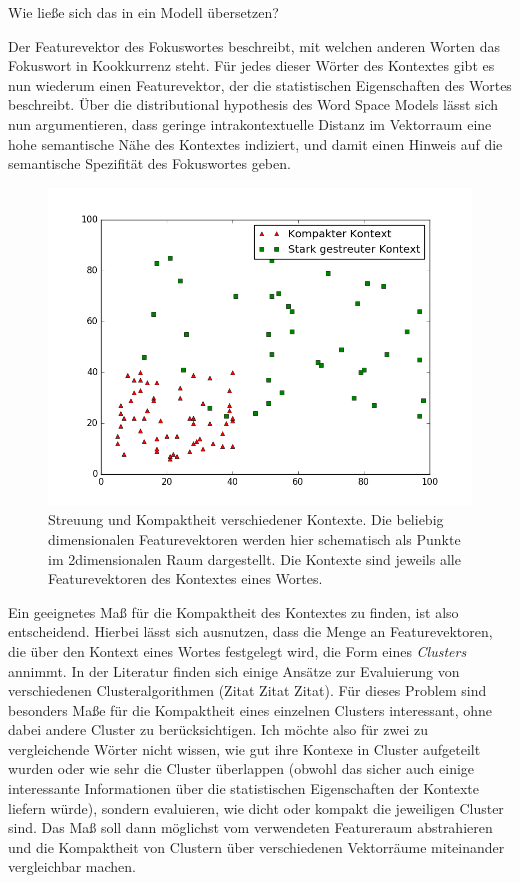\documentclass[11pt,numbers=noenddot]{scrartcl}
\begin{document}
Wie ließe sich das in ein Modell übersetzen?

Der Featurevektor des Fokuswortes beschreibt, mit welchen anderen Worten das Fokuswort in Kookkurrenz steht. Für jedes dieser Wörter des Kontextes gibt es nun wiederum einen Featurevektor, der die statistischen Eigenschaften des Wortes beschreibt. Über die distributional hypothesis des Word Space Models lässt sich nun argumentieren, dass geringe intrakontextuelle Distanz im Vektorraum eine hohe semantische Nähe des Kontextes indiziert, und damit einen Hinweis auf die semantische Spezifität des Fokuswortes geben.

\begin{figure}
    \includegraphics[width = \textwidth]{kontext}
    \caption{Streuung und Kompaktheit verschiedener Kontexte. Die beliebig dimensionalen Featurevektoren werden hier schematisch als Punkte im 2dimensionalen Raum dargestellt. Die Kontexte sind jeweils alle Featurevektoren des Kontextes eines Wortes.}
    \label{kontext}
\end{figure}

Ein geeignetes Maß für die Kompaktheit des Kontextes zu finden, ist also entscheidend. Hierbei lässt sich ausnutzen, dass die Menge an Featurevektoren, die über den Kontext eines Wortes festgelegt wird, die Form eines \emph{Clusters} annimmt. In der Literatur finden sich einige Ansätze zur Evaluierung von verschiedenen Clusteralgorithmen (Zitat Zitat Zitat). Für dieses Problem sind besonders Maße für die Kompaktheit eines einzelnen Clusters interessant, ohne dabei andere Cluster zu berücksichtigen. Ich möchte also für zwei zu vergleichende Wörter nicht wissen, wie gut ihre Kontexe in Cluster aufgeteilt wurden oder wie sehr die Cluster überlappen (obwohl das sicher auch einige interessante Informationen über die statistischen Eigenschaften der Kontexte liefern würde), sondern evaluieren, wie dicht oder kompakt die jeweiligen Cluster sind. Das Maß soll dann möglichst vom verwendeten Featureraum abstrahieren und die Kompaktheit von Clustern über verschiedenen Vektorräume miteinander vergleichbar machen.
\end{document}
